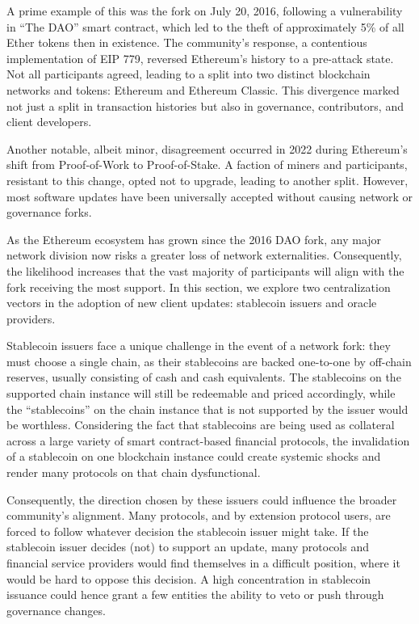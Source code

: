 \documentclass[No]{AEA}
\begin{document}
A prime example of this was the fork on July 20, 2016, following a vulnerability in ``The DAO'' smart contract, which led to the theft of approximately 5\% of all Ether tokens then in existence. The community's response, a contentious implementation of EIP 779, reversed Ethereum's history to a pre-attack state. Not all participants agreed, leading to a split into two distinct blockchain networks and tokens: Ethereum and Ethereum Classic. This divergence marked not just a split in transaction histories but also in governance, contributors, and client developers.

Another notable, albeit minor, disagreement occurred in 2022 during Ethereum's shift from Proof-of-Work to Proof-of-Stake. A faction of miners and participants, resistant to this change, opted not to upgrade, leading to another split. However, most software updates have been universally accepted without causing network or governance forks.

As the Ethereum ecosystem has grown since the 2016 DAO fork, any major network division now risks a greater loss of network externalities. Consequently, the likelihood increases that the vast majority of participants will align with the fork receiving the most support. In this section, we explore two centralization vectors in the adoption of new client updates: stablecoin issuers and oracle providers.


Stablecoin issuers face a unique challenge in the event of a network fork: they must choose a single chain, as their stablecoins are backed one-to-one by off-chain reserves, usually consisting of cash and cash equivalents. The stablecoins on the supported chain instance will still be redeemable and priced accordingly, while the ``stablecoins'' on the chain instance that is not supported by the issuer would be worthless. Considering the fact that stablecoins are being used as collateral across a large variety of smart contract-based financial protocols, the invalidation of a stablecoin on one blockchain instance could create systemic shocks and render many protocols on that chain dysfunctional. 

Consequently, the direction chosen by these issuers could influence the broader community's alignment. Many protocols, and by extension protocol users, are forced to follow whatever decision the stablecoin issuer might take. If the stablecoin issuer decides (not) to support an update, many protocols and financial service providers would find themselves in a difficult position, where it would be hard to oppose this decision. A high concentration in stablecoin issuance could hence grant a few entities the ability to veto or push through governance changes.
\end{document}
